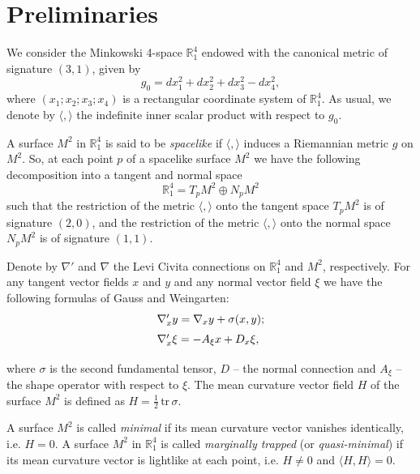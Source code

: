 \documentclass[12pt]{amsart}
\newcommand{\R}{\mathbb R}
\theoremstyle{definition}
\theoremstyle{remark}
\newcommand{\ds}{\displaystyle}
\newcommand{\tr}{\mathrm{tr}}
\numberwithin{equation}{section}
\begin{document}
\section{Preliminaries}

We consider the Minkowski 4-space  $\R^4_1$  endowed with the canonical metric  of signature $(3,1)$, 
given by 
$$g_0 = dx_1^2 + dx_2^2 + dx_3^2 -dx_4^2,$$
where $(x_1; x_2; x_3; x_4)$  is a rectangular coordinate system of $\R^4_1$. As usual, we denote by $\langle , \rangle$ the indefinite inner scalar product with respect to $g_0$. 

A surface $M^2$ in $\R^4_1$ is said to be
\emph{spacelike} if $\langle , \rangle$ induces  a Riemannian
metric $g$ on $M^2$. So, at each point $p$ of a spacelike surface
$M^2$ we have the following decomposition into a tangent and normal space
$$\R^4_1 = T_pM^2 \oplus N_pM^2$$
such  that the restriction of the metric
$\langle , \rangle$  onto the tangent space $T_pM^2$ is of
signature $(2,0)$, and the restriction of the metric $\langle , \rangle$ onto the normal space $N_pM^2$ is of signature $(1,1)$.

Denote by $\nabla'$ and $\nabla$ the Levi Civita connections on $\R^4_1$ and $M^2$, respectively.
For any tangent vector fields   $x$ and $y$ and any normal vector field $\xi$ we have the following formulas of Gauss and Weingarten:
$$\begin{array}{l}
\vspace{2mm}
\nabla'_xy = \nabla_xy + \sigma(x,y);\\
\vspace{2mm}
\nabla'_x \xi = - A_{\xi} x + D_x \xi,
\end{array}$$
where $\sigma$ is the second fundamental tensor, $D$ -- the normal connection 
and  $A_{\xi}$ -- the shape operator with respect to $\xi$.
The mean curvature vector  field $H$ of the surface $M^2$ is defined as
$H = \ds{\frac{1}{2}\,  \tr\, \sigma}$.

A surface $M^2$  is called \textit{minimal} if its mean curvature vector vanishes identically, i.e.
$H = 0$.  A surface $M^2$ in $\R^4_1$ is called \textit{marginally trapped} (or \textit{quasi-minimal}) if its mean curvature vector is lightlike at each point, i.e. $H \neq  0$ and $\langle H, H \rangle = 0$.  
\end{document}
